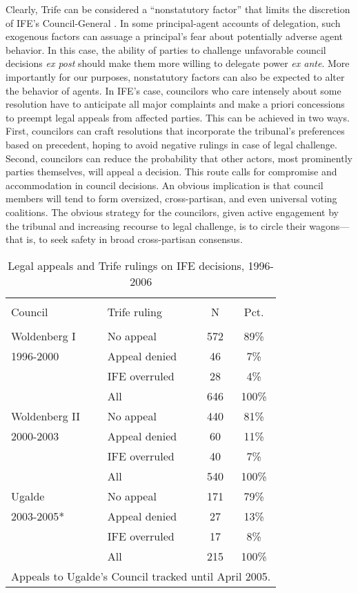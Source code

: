 \documentclass[12 pt, letter]{article}
\begin{document}
Clearly, {\sc Trife} can be considered a ``nonstatutory factor'' that limits the discretion of IFE's Council-General \citep{Huber2002}.  In some principal-agent accounts of delegation, such exogenous factors can assuage a principal's fear about potentially adverse agent behavior.  In this case, the ability of parties to challenge unfavorable council decisions \emph{ex post} should make them more willing to delegate power \emph{ex ante}.  More importantly for our purposes, nonstatutory factors can also be expected to alter the behavior of agents.  In IFE's case, councilors who care intensely about some resolution have to anticipate all major complaints and make a priori concessions to preempt legal appeals from affected parties.  This can be achieved in two ways.  First, councilors can craft resolutions that incorporate the tribunal's preferences based on precedent, hoping to avoid negative rulings in case of legal challenge.  Second, councilors can reduce the probability that other actors, most prominently parties themselves, will appeal a decision.  This route calls for compromise and accommodation in council decisions.  An obvious implication is that council members will tend to form oversized, cross-partisan, and even universal voting coalitions.  The obvious strategy for the councilors, given active engagement by the tribunal and increasing recourse to legal challenge, is to circle their wagons---that is, to seek safety in broad cross-partisan consensus.

\begin{table}
\caption{Legal appeals and {\sc Trife} rulings on IFE decisions, 1996-2006}\label{T:rulings}
\begin{center}
\begin{tabular}{llcc}
\hline\\ [-1.5ex]
Council & {\sc Trife} ruling &  N  & Pct. \\
\hline \\ [-1ex]
Woldenberg I & No appeal  & 572 &  89\% \\
1996-2000 & Appeal denied &  46 &   7\% \\
          & IFE overruled &  28 &   4\% \\
          & All           & 646 & 100\% \\ [1.2ex]
Woldenberg II & No appeal & 440 &  81\% \\
2000-2003 & Appeal denied &  60 &  11\% \\
          & IFE overruled &  40 &   7\% \\
          & All           & 540 & 100\% \\ [1.2ex]
Ugalde    & No appeal     & 171 &  79\% \\
2003-2005* & Appeal denied &  27 &  13\% \\
          & IFE overruled &  17 &   8\% \\
          & All           & 215 & 100\% \\
\hline \multicolumn{4}{l}{\small * Appeals to Ugalde's Council
tracked until April 2005.}
\end{tabular}
\end{center}
\end{table}
\end{document}
